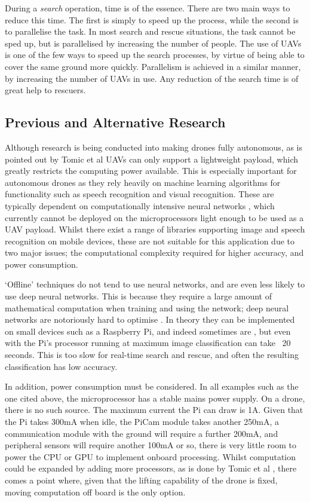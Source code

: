 \documentclass{article}
\begin{document}
During a \emph{search} operation, time is of the essence. There are two main ways to reduce this time. The first is simply to speed up the process, while the second is to parallelise the task. In most search and rescue situations, the task cannot be sped up, but is parallelised by increasing the number of people. The use of UAVs is one of the few ways to speed up the search processes, by virtue of being able to cover the same ground more quickly. Parallelism is achieved in a similar manner, by increasing the number of UAVs in use. Any reduction of the search time is of great help to rescuers. 

\subsection{Previous and Alternative Research}
Although research is being conducted into making drones fully autonomous, as is pointed out by Tomic et al  \cite{Autonomous} UAVs can only support a lightweight payload, which greatly restricts the computing power available. This is especially important for autonomous drones as they rely heavily on machine learning algorithms for functionality such as speech recognition and visual recognition. These are typically dependent on computationally intensive neural networks \cite{Neural}, which currently cannot be deployed on the microprocessors light enough to be used as a UAV payload. Whilst there exist a range of libraries supporting image and speech recognition on mobile devices, these are not suitable for this application due to two major issues; the computational complexity required for higher accuracy, and power consumption. 

`Offline' techniques do not tend to use neural networks, and are even less likely to use deep neural networks. This is because they require a large amount of mathematical computation when training and using the network; deep neural networks are notoriously hard to optimise \cite{DeepAI}. In theory they can be implemented on small devices such as a Raspberry Pi, and indeed sometimes are \cite{DeepPi}, but even with the Pi's processor running at maximum image classification can take ~20 seconds. This is too slow for real-time search and rescue, and often the resulting classification has low accuracy. 

In addition, power consumption must be considered. In all examples such as the one cited above, the microprocessor has a stable mains power supply. On a drone, there is no such source. The maximum current the Pi can draw is 1A. Given that the Pi takes 300mA when idle, the PiCam module takes another 250mA, a communication module with the ground will require a further 200mA, and peripheral sensors will require another 100mA or so, there is very little room to power the CPU or GPU to implement onboard processing. Whilst computation could be expanded by adding more processors, as is done by Tomic et al \cite{Autonomous}, there comes a point where, given that the lifting capability of the drone is fixed, moving computation off board is the only option.
\end{document}
